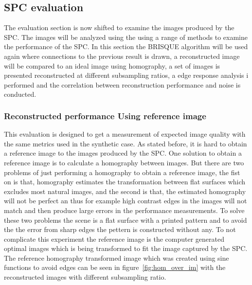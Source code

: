 

\subsection{SPC evaluation}
\label{sec:eval_spc}
The evaluation section is now shifted to examine the images produced by the SPC. The images will be analyzed using the using a range of methods to examine the performance of the SPC. In this section the BRISQUE algorithm will be used again where connections to the previous result is drawn, a reconstructed image will be compared to an ideal image using homography, a set of images is presented reconstructed at different subsampling ratios, a edge response analysis i performed and the correlation between reconstruction performance and noise is conducted. 



\subsubsection{Reconstructed performance Using reference image}
This evaluation is designed to get a measurement of expected image quality with the same metrics used in the synthetic case. As stated before, it is hard to obtain a reference image to the images produced by the SPC. One solution to obtain a reference image is to calculate a homography between images. But there are two problems of just performing a homography to obtain a reference image, the fist on is that, homography estimates the transformation between flat surfaces which excludes most natural images, and the second is that, the estimated homography will not be perfect an thus for example high contrast edges in the images will not match and then produce large errors in the performance measurements. To solve these two problems the scene is a flat surface with a printed pattern and to avoid the the error from sharp edges the pettern is constructed without any. To not complicate this experiment the reference image is the computer generated optimal images which is being transformed to fit the image captured by the SPC.\\[0.1in] 

The reference homography transformed image which was created using sine functions to avoid edges can be seen in figure~\ref{fig:hom_over_im} with the reconstructed images with different subsampling ratio.   


